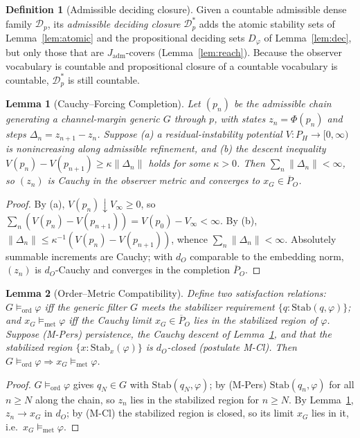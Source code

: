 \documentclass[11pt]{article}
\newtheorem{lemma}{Lemma}
\theoremstyle{definition}
\newtheorem{definition}{Definition}
\theoremstyle{remark}
\newcommand{\Stab}{\mathrm{Stab}}
\newcommand{\Jadm}{J_{\mathrm{adm}}}
\begin{document}
\begin{definition}[Admissible deciding closure]\label{def:closure}
Given a countable admissible dense family $\mathcal{D}_p$, its \emph{admissible deciding closure}
$\mathcal{D}_p^\ast$ adds the atomic stability sets of Lemma~\ref{lem:atomic} and the propositional
deciding sets $D_\varphi$ of Lemma~\ref{lem:dec}, but only those that are $\Jadm$-covers
(Lemma~\ref{lem:reach}). Because the observer vocabulary is countable and propositional closure of a
countable vocabulary is countable, $\mathcal{D}_p^\ast$ is still countable.
\end{definition}

\begin{lemma}[Cauchy--Forcing Completion]\label{lem:cauchy}
Let $(p_n)$ be the admissible chain generating a channel-margin generic $G$ through $p$, with states
$z_n=\Phi(p_n)$ and steps $\Delta_n=z_{n+1}-z_n$. Suppose (a) a residual-instability potential
$V:P_H\to[0,\infty)$ is nonincreasing along admissible refinement, and (b) the descent inequality
$V(p_n)-V(p_{n+1})\ge\kappa\|\Delta_n\|$ holds for some $\kappa>0$. Then $\sum_n\|\Delta_n\|<\infty$,
so $(z_n)$ is Cauchy in the observer metric and converges to $x_G\in\overline{P}_O$.
\end{lemma}

\begin{proof}
By (a), $V(p_n)\downarrow V_\infty\ge0$, so $\sum_n(V(p_n)-V(p_{n+1}))=V(p_0)-V_\infty<\infty$.
By (b), $\|\Delta_n\|\le\kappa^{-1}(V(p_n)-V(p_{n+1}))$, whence $\sum_n\|\Delta_n\|<\infty$.
Absolutely summable increments are Cauchy; with $d_O$ comparable to the embedding norm, $(z_n)$ is
$d_O$-Cauchy and converges in the completion $\overline{P}_O$.
\end{proof}

\begin{lemma}[Order--Metric Compatibility]\label{lem:ordmet}
Define two satisfaction relations: $G\models_{\mathrm{ord}}\varphi$ iff the generic filter $G$ meets
the stabilizer requirement $\{q:\Stab(q,\varphi)\}$; and $x_G\models_{\mathrm{met}}\varphi$ iff the
Cauchy limit $x_G\in\overline{P}_O$ lies in the stabilized region of $\varphi$. Suppose (M-Pers)
persistence, the Cauchy descent of Lemma~\ref{lem:cauchy}, and that the stabilized region
$\{x:\Stab_x(\varphi)\}$ is $d_O$-closed (postulate M-Cl). Then
$G\models_{\mathrm{ord}}\varphi\Rightarrow x_G\models_{\mathrm{met}}\varphi$.
\end{lemma}

\begin{proof}
$G\models_{\mathrm{ord}}\varphi$ gives $q_N\in G$ with $\Stab(q_N,\varphi)$; by (M-Pers)
$\Stab(q_n,\varphi)$ for all $n\ge N$ along the chain, so $z_n$ lies in the stabilized region for
$n\ge N$. By Lemma~\ref{lem:cauchy}, $z_n\to x_G$ in $d_O$; by (M-Cl) the stabilized region is closed,
so its limit $x_G$ lies in it, i.e.\ $x_G\models_{\mathrm{met}}\varphi$.
\end{proof}
\end{document}
